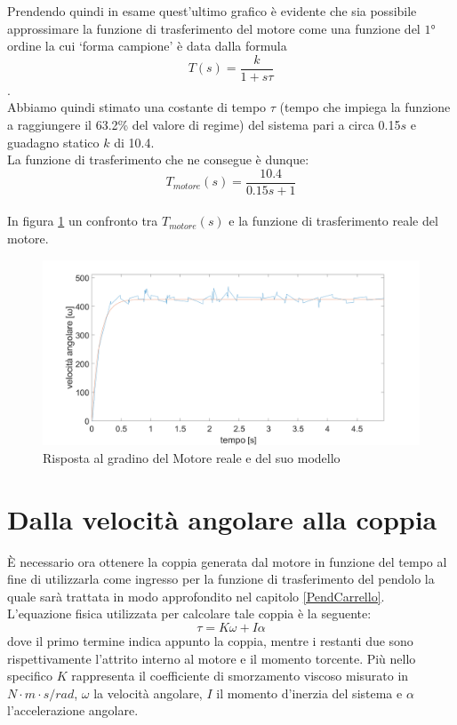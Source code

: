 Prendendo quindi in esame quest'ultimo grafico è evidente che sia possibile approssimare la funzione di trasferimento del motore come una funzione del $\ang{1}$ ordine la cui `forma campione' è data dalla formula $$T(s)=\displaystyle\frac{k}{1+s\tau}$$. \\
Abbiamo quindi stimato una costante di tempo $\tau$ (tempo che impiega la funzione a raggiungere il 63.2\% del valore di regime) del sistema pari a circa 0.15$s$ e guadagno statico $k$ di 10.4.\\
La funzione di trasferimento che ne consegue è dunque:
\\
$$
T_{motore}(s)=\displaystyle\frac{10.4}{0.15s+1}
$$
\\
In figura \ref{modMotorvsReale} un confronto tra $T_{motore}(s)$ e la funzione di trasferimento reale del motore.
\begin{figure}[ht]
	\centering
	\includegraphics[width=\textwidth]{modMotorvsReale.png}
	\caption{Risposta al gradino del Motore reale e del suo modello}
	\label{modMotorvsReale}
\end{figure}

\section{Dalla velocità angolare alla coppia}
È necessario ora ottenere la coppia generata dal motore in funzione del tempo al fine di utilizzarla come ingresso per la funzione di trasferimento del pendolo la quale sarà trattata in modo approfondito nel capitolo \ref{PendCarrello}.\\
L'equazione fisica utilizzata per calcolare tale coppia è la seguente:
$$
\tau=K\omega+I\alpha
$$
dove il primo termine indica appunto la coppia, mentre i restanti due sono rispettivamente l'attrito interno al motore e il momento torcente.
Più nello specifico $K$ rappresenta il coefficiente di smorzamento viscoso misurato in $N\cdot m\cdot s/rad$, $\omega$ la velocità angolare, $I$ il momento d'inerzia del sistema e $\alpha$ l'accelerazione angolare.

